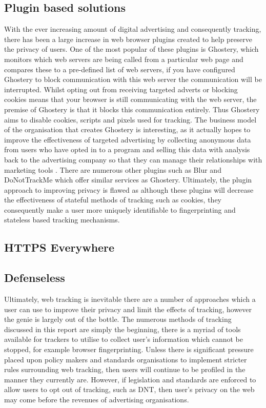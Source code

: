 \documentclass{article}
\begin{document}
\subsection{Plugin based solutions}
With the ever increasing amount of digital advertising and consequently tracking, there has been a large increase in web browser plugins created to help preserve the privacy of users. One of the most popular of these plugins is Ghostery, which monitors which web servers are being called from a particular web page and compares these to a pre-defined list of web servers, if you have configured Ghostery to block communication with this web server the communication will be interrupted. Whilst opting out from receiving targeted adverts or blocking cookies means that your browser is still communicating with the web server, the premise of Ghostery is that it blocks this communication entirely. Thus Ghostery aims to disable cookies, scripts and pixels used for tracking. The business model of the organisation that creates Ghostery is interesting, as it actually hopes to improve the effectiveness of targeted advertising by collecting anonymous data from users who have opted in to a program and selling this data with analysis back to the advertising company so that they can manage their relationships with marketing tools \parencite{ghostery}. There are numerous other plugins such as Blur and DoNotTrackMe which offer similar services as Ghostery. Ultimately, the plugin approach to improving privacy is flawed as although these plugins will decrease the effectiveness of stateful methods of tracking such as cookies, they consequently make a user more uniquely identifiable to fingerprinting and stateless based tracking mechanisms.

\subsection{HTTPS Everywhere}


\subsection{Defenseless}
Ultimately, web tracking is inevitable there are a number of approaches which a user can use to improve their privacy and limit the effects of tracking, however the genie is largely out of the bottle. The numerous methods of tracking discussed in this report are simply the beginning, there is a myriad of tools available for trackers to utilise to collect user's information which cannot be stopped, for example browser fingerprinting. Unless there is significant pressure placed upon policy makers and standards organisations to implement stricter rules surrounding web tracking, then users will continue to be profiled in the manner they currently are. However, if legislation and standards are enforced to allow users to opt out of tracking, such as DNT, then user's privacy on the web may come before the revenues of advertising organisations.    
\end{document}
